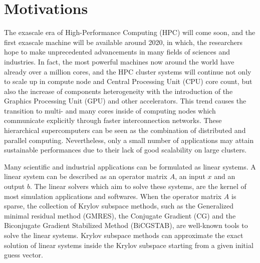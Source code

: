 \section{Motivations}

The exascale era of High-Performance Computing (HPC) will come soon, and the first exascale machine will be available around 2020, in which, the researchers hope to make unprecedented advancements in many fields of sciences and industries. In fact, the most powerful machines now around the world have already over a million cores, and the HPC cluster systems will continue not only to scale up in compute node and Central Processing Unit (CPU) core count, but also the increase of components heterogeneity with the introduction of the Graphics Processing Unit (GPU) and other accelerators. This trend causes the transition to multi- and many cores inside of computing nodes which communicate explicitly through faster interconnection networks. These hierarchical supercomputers can be seen as the combination of distributed and parallel computing. Nevertheless, only a small number of applications may attain sustainable performances due to their lack of good scalability on large clusters. 

Many scientific and industrial applications can be formulated as linear systems. A linear system can be described as an operator matrix $A$, an input $x$ and an output $b$. The linear solvers which aim to solve these systems, are the kernel of most simulation applications and softwares. When the operator matrix $A$ is sparse, the collection of Krylov subspace methods, such as the Generalized minimal residual method (GMRES), the Conjugate Gradient (CG)  and the Biconjugate Gradient Stabilized Method (BiCGSTAB), are well-known tools to solve the linear systems. Krylov subspace methods can approximate the exact solution of linear systems inside the Krylov subspace starting from a given initial guess vector. 

